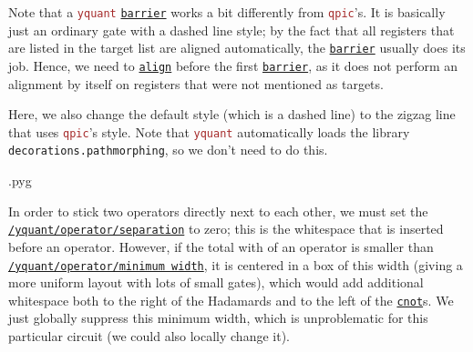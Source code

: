 \documentclass{scrartcl}
\makeatletter
\newenvironment{codeexample}{%
   \VerbatimEnvironment%
   \let\FVB@VerbatimOut\minted@FVB@VerbatimOut
   \let\FVE@VerbatimOut\minted@FVE@VerbatimOut
   \minted@configlang{tex}%
   \minted@fvset
   \begin{VerbatimOut}[codes={\catcode`\^^I=12},firstline,lastline]{\minted@jobname.pyg}%
}{
   \end{VerbatimOut}%
   \minted@langlinenoson%
   \savebox\codeexamplebox{ \minted@jobname.pyg}%
   \ifdim\wd\codeexamplebox>\dimexpr.5\linewidth-3mm\relax%
      \wd\codeexamplebox=.5\linewidth%
   \else%
      \wd\codeexamplebox=\dimexpr\wd\codeexamplebox+3mm\relax%
   \fi%
   \noindent\begin{minipage}{\wd\codeexamplebox}%
      \centering%
      \usebox\codeexamplebox%
   \end{minipage}%
   \begin{minipage}{\dimexpr\linewidth-\wd\codeexamplebox\relax}%
      \expandafter\minted@pygmentize\expandafter{\minted@lang}%
   \end{minipage}%
   \minted@langlinenosoff%
   \par%
}
\newenvironment{codeexample*}{%
   \VerbatimEnvironment%
   \let\FVB@VerbatimOut\minted@FVB@VerbatimOut
   \let\FVE@VerbatimOut\minted@FVE@VerbatimOut
   \minted@configlang{tex}%
   \minted@fvset
   \begin{VerbatimOut}[codes={\catcode`\^^I=12},firstline,lastline]{\minted@jobname.pyg}%
}{
   \end{VerbatimOut}%
   \minted@langlinenoson%
   \begin{adjustbox}{center}
       \minted@jobname.pyg %
   \end{adjustbox}\nopagebreak
   \expandafter\minted@pygmentize\expandafter{\minted@lang}%
   \minted@langlinenosoff%
   \par%
}
\def\pkg#1{\textcolor{brown}{\texttt{#1}}}
\def\gate#1{\hyperref[gate:#1]{\texttt{#1}}}
\def\style#1{\hyperref[style:#1]{\texttt{#1}}}
\def\Yquant{\pkg{yquant}}
\makeatother
\begin{document}
            \begin{example}
               \begin{codeexample*}
               \end{codeexample*}
               Note that a \Yquant{} \gate{barrier} works a bit differently from \pkg{qpic}'s.
               It is basically just an ordinary gate with a dashed line style; by the fact that all registers that are listed in the target list are aligned automatically, the \gate{barrier} usually does its job.
               Hence, we need to \gate{align} before the first \gate{barrier}, as it does not perform an alignment by itself on registers that were not mentioned as targets.

               Here, we also change the default style (which is a dashed line) to the zigzag line that uses \pkg{qpic}'s style.
               Note that \Yquant{} automatically loads the library \texttt{decorations.pathmorphing}, so we don't need to do this.
            \end{example}

            \begin{example}
               \begin{codeexample}
               \end{codeexample}
               In order to stick two operators directly next to each other, we must set the \style{/yquant/operator/separation} to zero; this is the whitespace that is inserted before an operator.
               However, if the total with of an operator is smaller than \style{/yquant/operator/minimum width}, it is centered in a box of this width (giving a more uniform layout with lots of small gates), which would add additional whitespace both to the right of the Hadamards and to the left of the \gate{cnot}s.
               We just globally suppress this minimum width, which is unproblematic for this particular circuit (we could also locally change it).
            \end{example}
\end{document}
